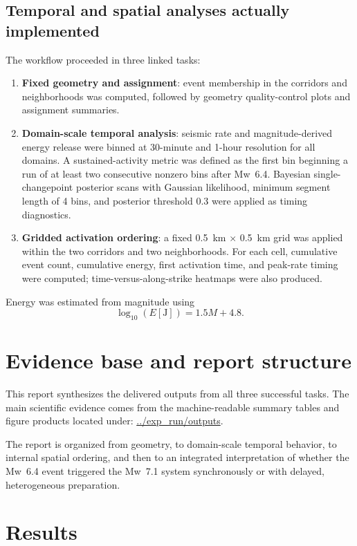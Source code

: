 \documentclass[11pt]{article}
\begin{document}
\subsection{Temporal and spatial analyses actually implemented}
The workflow proceeded in three linked tasks:
\begin{enumerate}[label=\arabic*)]
    \item \textbf{Fixed geometry and assignment}: event membership in the corridors and neighborhoods was computed, followed by geometry quality-control plots and assignment summaries.
    \item \textbf{Domain-scale temporal analysis}: seismic rate and magnitude-derived energy release were binned at 30-minute and 1-hour resolution for all domains. A sustained-activity metric was defined as the first bin beginning a run of at least two consecutive nonzero bins after Mw~6.4. Bayesian single-changepoint posterior scans with Gaussian likelihood, minimum segment length of 4 bins, and posterior threshold 0.3 were applied as timing diagnostics.
    \item \textbf{Gridded activation ordering}: a fixed 0.5~km $\times$ 0.5~km grid was applied within the two corridors and two neighborhoods. For each cell, cumulative event count, cumulative energy, first activation time, and peak-rate timing were computed; time-versus-along-strike heatmaps were also produced.
\end{enumerate}
Energy was estimated from magnitude using
\[
\log_{10}(E[\mathrm{J}]) = 1.5M + 4.8.
\]

\section{Evidence base and report structure}
This report synthesizes the delivered outputs from all three successful tasks. The main scientific evidence comes from the machine-readable summary tables and figure products located under:
\url{../exp_run/outputs}.

The report is organized from geometry, to domain-scale temporal behavior, to internal spatial ordering, and then to an integrated interpretation of whether the Mw~6.4 event triggered the Mw~7.1 system synchronously or with delayed, heterogeneous preparation.

\section{Results}
\end{document}
